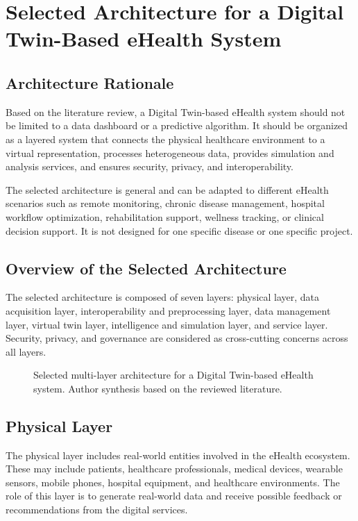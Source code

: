 \chapter{Selected Architecture for a Digital Twin-Based eHealth System}

\section{Architecture Rationale}
Based on the literature review, a Digital Twin-based eHealth system should not be limited to a data dashboard or a predictive algorithm. It should be organized as a layered system that connects the physical healthcare environment to a virtual representation, processes heterogeneous data, provides simulation and analysis services, and ensures security, privacy, and interoperability.

The selected architecture is general and can be adapted to different eHealth scenarios such as remote monitoring, chronic disease management, hospital workflow optimization, rehabilitation support, wellness tracking, or clinical decision support. It is not designed for one specific disease or one specific project.

\section{Overview of the Selected Architecture}
The selected architecture is composed of seven layers: physical layer, data acquisition layer, interoperability and preprocessing layer, data management layer, virtual twin layer, intelligence and simulation layer, and service layer. Security, privacy, and governance are considered as cross-cutting concerns across all layers.

\begin{figure}[H]
    \centering
    \resizebox{0.98\textwidth}{!}{}
    \caption{Selected multi-layer architecture for a Digital Twin-based eHealth system. Author synthesis based on the reviewed literature.}
    \label{fig:proposed_architecture}
\end{figure}

\section{Physical Layer}
The physical layer includes real-world entities involved in the eHealth ecosystem. These may include patients, healthcare professionals, medical devices, wearable sensors, mobile phones, hospital equipment, and healthcare environments. The role of this layer is to generate real-world data and receive possible feedback or recommendations from the digital services.

